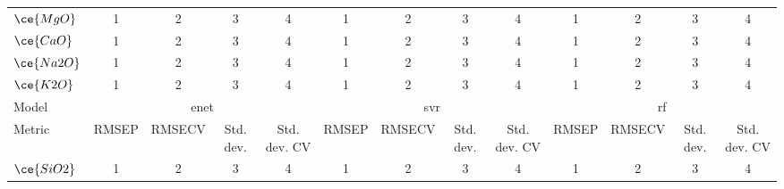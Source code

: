 \begin{table*}[]
{\begin{tabular}{l|cccc|cccc|cccc}
$\ce{MgO}$   & \multicolumn{1}{c}{1}     & \multicolumn{1}{c}{2}           & \multicolumn{1}{c}{3}       & \multicolumn{1}{c|}{4}            & \multicolumn{1}{c}{1}     & \multicolumn{1}{c}{2}           & \multicolumn{1}{c}{3}       & \multicolumn{1}{c|}{4}            & \multicolumn{1}{c}{1}     & \multicolumn{1}{c}{2}           & \multicolumn{1}{c}{3}       & 4                             \\
$\ce{CaO}$   & \multicolumn{1}{c}{1}     & \multicolumn{1}{c}{2}           & \multicolumn{1}{c}{3}       & \multicolumn{1}{c|}{4}            & \multicolumn{1}{c}{1}     & \multicolumn{1}{c}{2}           & \multicolumn{1}{c}{3}       & \multicolumn{1}{c|}{4}            & \multicolumn{1}{c}{1}     & \multicolumn{1}{c}{2}           & \multicolumn{1}{c}{3}       & 4                             \\
$\ce{Na2O}$  & \multicolumn{1}{c}{1}     & \multicolumn{1}{c}{2}           & \multicolumn{1}{c}{3}       & \multicolumn{1}{c|}{4}            & \multicolumn{1}{c}{1}     & \multicolumn{1}{c}{2}           & \multicolumn{1}{c}{3}       & \multicolumn{1}{c|}{4}            & \multicolumn{1}{c}{1}     & \multicolumn{1}{c}{2}           & \multicolumn{1}{c}{3}       & 4                             \\
$\ce{K2O}$   & \multicolumn{1}{c}{1}     & \multicolumn{1}{c}{2}           & \multicolumn{1}{c}{3}       & \multicolumn{1}{c|}{4}            & \multicolumn{1}{c}{1}     & \multicolumn{1}{c}{2}           & \multicolumn{1}{c}{3}       & \multicolumn{1}{c|}{4}            & \multicolumn{1}{c}{1}     & \multicolumn{1}{c}{2}           & \multicolumn{1}{c}{3}       & 4                             \\
\hline
Model        & \multicolumn{4}{c|}{\gls{enet}} & \multicolumn{4}{c|}{\gls{svr}} & \multicolumn{4}{c}{\gls{rf}} \\
Metric       & \multicolumn{1}{c}{RMSEP} & \multicolumn{1}{c}{RMSECV} & \multicolumn{1}{c}{Std. dev.} & \multicolumn{1}{c|}{Std. dev. CV} & \multicolumn{1}{c}{RMSEP} & \multicolumn{1}{c}{RMSECV} & \multicolumn{1}{c}{Std. dev.} & \multicolumn{1}{c|}{Std. dev. CV} & \multicolumn{1}{c}{RMSEP} & \multicolumn{1}{c}{RMSECV} & \multicolumn{1}{c}{Std. dev.} & \multicolumn{1}{c}{Std. dev. CV} \\
\hline
$\ce{SiO2}$  & \multicolumn{1}{c}{1}     & \multicolumn{1}{c}{2}           & \multicolumn{1}{c}{3}       & \multicolumn{1}{c|}{4}            & \multicolumn{1}{c}{1}     & \multicolumn{1}{c}{2}           & \multicolumn{1}{c}{3}       & \multicolumn{1}{c|}{4}            & \multicolumn{1}{c}{1}     & \multicolumn{1}{c}{2}           & \multicolumn{1}{c}{3}       & 4                             \\

\end{tabular}}
\end{table*}
